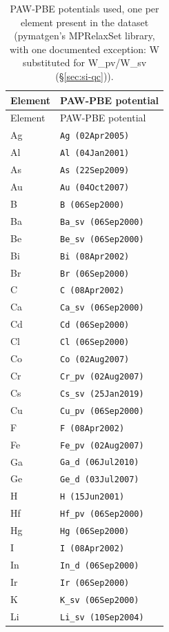 \begin{longtable}{@{}l l@{}}
\caption{PAW-PBE potentials used, one per element present in the dataset (pymatgen's MPRelaxSet library, with one documented exception: W substituted for W\_pv/W\_sv (\S\ref{sec:si-qc})).}\label{tab:si-potcar}\\
\toprule
Element & PAW-PBE potential \\
\midrule
\endfirsthead
\toprule
Element & PAW-PBE potential \\
\midrule
\endhead
\bottomrule
\endfoot
Ag & \texttt{Ag (02Apr2005)} \\
Al & \texttt{Al (04Jan2001)} \\
As & \texttt{As (22Sep2009)} \\
Au & \texttt{Au (04Oct2007)} \\
B & \texttt{B (06Sep2000)} \\
Ba & \texttt{Ba\_sv (06Sep2000)} \\
Be & \texttt{Be\_sv (06Sep2000)} \\
Bi & \texttt{Bi (08Apr2002)} \\
Br & \texttt{Br (06Sep2000)} \\
C & \texttt{C (08Apr2002)} \\
Ca & \texttt{Ca\_sv (06Sep2000)} \\
Cd & \texttt{Cd (06Sep2000)} \\
Cl & \texttt{Cl (06Sep2000)} \\
Co & \texttt{Co (02Aug2007)} \\
Cr & \texttt{Cr\_pv (02Aug2007)} \\
Cs & \texttt{Cs\_sv (25Jan2019)} \\
Cu & \texttt{Cu\_pv (06Sep2000)} \\
F & \texttt{F (08Apr2002)} \\
Fe & \texttt{Fe\_pv (02Aug2007)} \\
Ga & \texttt{Ga\_d (06Jul2010)} \\
Ge & \texttt{Ge\_d (03Jul2007)} \\
H & \texttt{H (15Jun2001)} \\
Hf & \texttt{Hf\_pv (06Sep2000)} \\
Hg & \texttt{Hg (06Sep2000)} \\
I & \texttt{I (08Apr2002)} \\
In & \texttt{In\_d (06Sep2000)} \\
Ir & \texttt{Ir (06Sep2000)} \\
K & \texttt{K\_sv (06Sep2000)} \\
Li & \texttt{Li\_sv (10Sep2004)} \\

\end{longtable}
